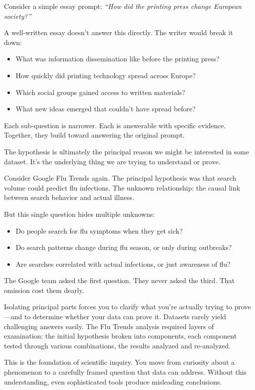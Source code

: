 Consider a simple essay prompt: \textit{``How did the printing press change European society?''}

A well-written essay doesn't answer this directly. The writer would break it down:
\begin{itemize}
    \item What was information dissemination like before the printing press?
    \item How quickly did printing technology spread across Europe?
    \item Which social groups gained access to written materials?
    \item What new ideas emerged that couldn't have spread before?
\end{itemize}

Each sub-question is narrower. Each is answerable with specific evidence.
Together, they build toward answering the original prompt.

The hypothesis is ultimately the principal reason we might be interested in some dataset.
It's the underlying thing we are trying to understand or prove.

Consider Google Flu Trends again. The principal hypothesis was that search
volume could predict flu infections. The unknown relationship: the causal
link between search behavior and actual illness.

But this single question hides multiple unknowns:
\begin{itemize}
    \item Do people search for flu symptoms when they get sick?
    \item Do search patterns change during flu season, or only during outbreaks?
    \item Are searches correlated with actual infections, or just awareness of flu?
\end{itemize}

The Google team asked the first question. They never asked the third.
That omission cost them dearly. 

Isolating principal parts forces you to clarify what you're actually trying
to prove---and to determine whether your data can prove it. Datasets rarely
yield challenging answers easily. The Flu Trends analysis required layers of
examination: the initial hypothesis broken into components, each component
tested through various combinations, the results analyzed and re-analyzed.

This is the foundation of scientific inquiry. You move from curiosity about
a phenomenon to a carefully framed question that data can address. Without
this understanding, even sophisticated tools produce misleading conclusions.

